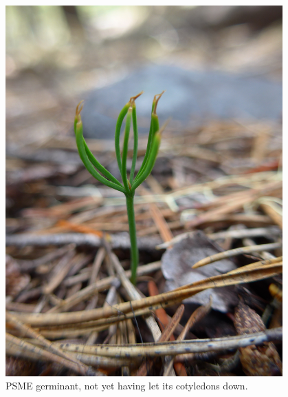 \documentclass[11pt,letter]{article}
\begin{document}
\begin{figure}[h!]
\centering
\includegraphics[width=0.95\textwidth]{images/2020June17_Rainier209_PSMEsm.jpg}
\caption{PSME germinant, not yet having let its cotyledons down.}
\label{fig:PSMEup} 
\end{figure}
\end{document}
